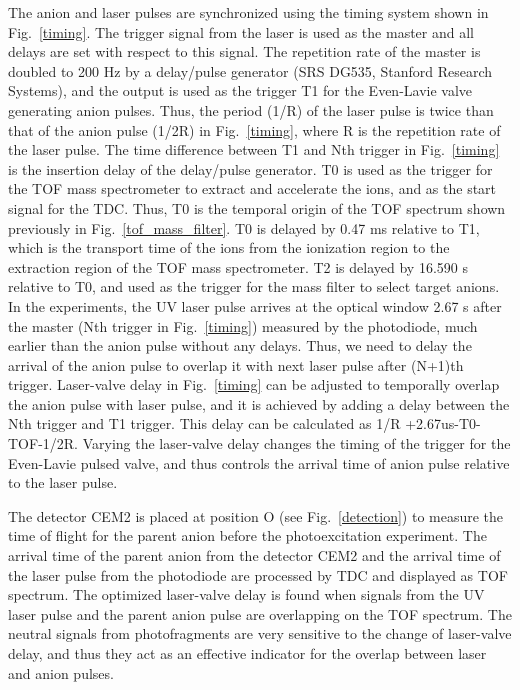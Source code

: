 \documentclass[%
aip,
rsi,
 amsmath,amssymb,
reprint,%
]{revtex4-1}
\begin{document}
The anion and laser pulses are synchronized using the timing system shown in Fig.~\ref{timing}. The trigger signal from the laser is used as the master and all delays are set with respect to this signal. The repetition rate of the master is doubled to 200 Hz by a delay/pulse generator (SRS DG535, Stanford Research Systems), and the output is used as the trigger T1 for the Even-Lavie valve generating anion pulses. Thus, the period (1/R) of the laser pulse is twice than that of the anion pulse (1/2R) in Fig.~\ref{timing}, where R is the repetition rate of the laser pulse. The time difference between T1 and Nth trigger in Fig.~\ref{timing} is the insertion delay of the delay/pulse generator. T0 is used as the trigger for the TOF mass spectrometer to extract and accelerate the ions, and as the start signal for the TDC. Thus, T0 is the temporal origin of the TOF spectrum shown previously in Fig.~\ref{tof_mass_filter}. T0 is delayed by 0.47 ms relative to T1, which is the transport time of the ions from the ionization region to the extraction region of the TOF mass spectrometer. T2 is delayed by 16.590 {\textmu}s relative to T0, and used as the trigger for the mass filter to select target anions. In the experiments, the UV laser pulse arrives at the optical window 2.67 {\textmu}s after the master (Nth trigger in Fig.~\ref{timing}) measured by the photodiode, much earlier than the anion pulse without any delays. Thus, we need to delay the arrival of the anion pulse to overlap it with next laser pulse after (N+1)th trigger. Laser-valve delay in Fig.~\ref{timing} can be adjusted to temporally overlap the anion pulse with laser pulse, and it is achieved by adding a delay between the Nth trigger and T1 trigger. This delay can be calculated as 1/R +2.67us-T0-TOF-1/2R. Varying the laser-valve delay changes the timing of the trigger for the Even-Lavie pulsed valve, and thus controls the arrival time of anion pulse relative to the laser pulse.   

The detector CEM2 is placed at position O (see Fig.~\ref{detection}) to measure the time of flight for the parent anion before the photoexcitation experiment. The arrival time of the parent anion from the detector CEM2 and the arrival time of the laser pulse from the photodiode are processed by TDC and displayed as TOF spectrum. The optimized laser-valve delay is found when signals from the UV laser pulse and the parent anion pulse are overlapping on the TOF spectrum. The neutral signals from photofragments are very sensitive to the change of laser-valve delay, and thus they act as an effective indicator for the overlap between laser and anion pulses.
\end{document}
